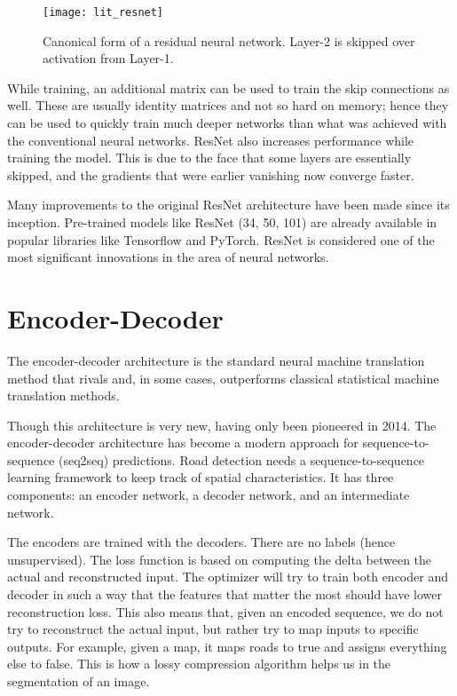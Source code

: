 \begin{figure}[h!]
    \centering
    \texttt{[image: lit\_resnet]}
    \caption[A residual network]{Canonical form of a residual neural network. Layer-2 is skipped over activation from Layer-1.}
    \label{fig:residual_network}
\end{figure}

While training, an additional matrix can be used to train the skip connections as well. These are usually identity matrices and not so hard on memory; hence they can be used to quickly train much deeper networks than what was achieved with the conventional neural networks. ResNet also increases performance while training the model. This is due to the face that some layers are essentially skipped, and the gradients that were earlier vanishing now converge faster.

Many improvements to the original ResNet architecture have been made since its inception. Pre-trained models like ResNet (34, 50, 101) are already available in popular libraries like Tensorflow and PyTorch. ResNet is considered one of the most significant innovations in the area of neural networks.

\section{Encoder-Decoder}
The encoder-decoder architecture is the standard neural machine translation method that rivals and, in some cases, outperforms classical statistical machine translation methods.

Though this architecture is very new, having only been pioneered in 2014. The encoder-decoder architecture has become a modern approach for sequence-to-sequence (seq2seq) predictions. Road detection needs a sequence-to-sequence learning framework to keep track of spatial characteristics. It has three components: an encoder network, a decoder network, and an intermediate network.

The encoders are trained with the decoders. There are no labels (hence unsupervised). The loss function is based on computing the delta between the actual and reconstructed input. The optimizer will try to train both encoder and decoder in such a way that the features that matter the most should have lower reconstruction loss. This also means that, given an encoded sequence, we do not try to reconstruct the actual input, but rather try to map inputs to specific outputs. For example, given a map, it maps roads to true and assigns everything else to false. This is how a lossy compression algorithm helps us in the segmentation of an image.

